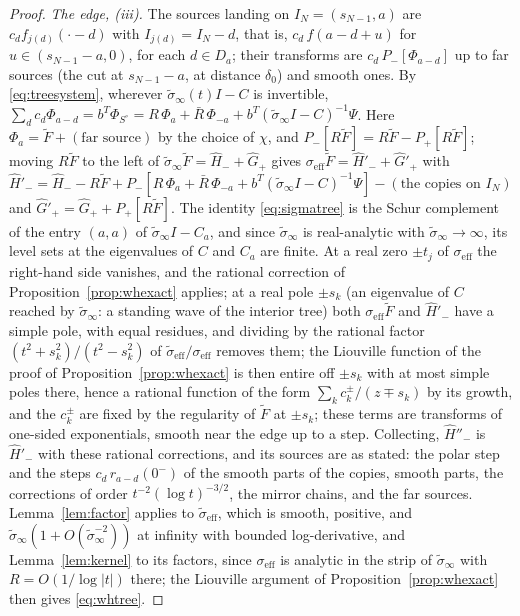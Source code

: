 \documentclass[11pt]{article}
\theoremstyle{definition}
\theoremstyle{remark}
\begin{document}
\begin{proof}
\emph{The edge, (iii).} The sources landing on $I_N=(s_{N-1},a)$ are $c_d f_{j(d)}(\cdot-d)$ with $I_{j(d)}=I_N-d$, that is, $c_d\,f(a-d+u)$ for $u\in(s_{N-1}-a,0)$, for each $d\in D_a$; their transforms are $c_d\,P_-[\Phi_{a-d}]$ up to far sources (the cut at $s_{N-1}-a$, at distance $\delta_0$) and smooth ones. By \eqref{eq:treesystem}, wherever $\tilde\sigma_\infty(t)I-C$ is invertible, $\sum_dc_d\Phi_{a-d}=b^{T}\Phi_{S^\circ}=R\,\Phi_a+\bar R\,\Phi_{-a}+b^T(\tilde\sigma_\infty I-C)^{-1}\Psi$. Here $\Phi_a=\tilde F+(\text{far source})$ by the choice of $\chi$, and $P_-[R\tilde F]=R\tilde F-P_+[R\tilde F]$; moving $R\tilde F$ to the left of $\tilde\sigma_\infty\tilde F=\hat H_-+\hat G_+$ gives $\sigma_{\mathrm{eff}}\tilde F=\hat H'_-+\hat G'_+$ with $\hat H'_-=\hat H_--R\tilde F+P_-[R\,\Phi_a+\bar R\,\Phi_{-a}+b^T(\tilde\sigma_\infty I-C)^{-1}\Psi]-(\text{the copies on }I_N)$ and $\hat G'_+=\hat G_++P_+[R\tilde F]$. The identity \eqref{eq:sigmatree} is the Schur complement of the entry $(a,a)$ of $\tilde\sigma_\infty I-C_a$, and since $\tilde\sigma_\infty$ is real-analytic with $\tilde\sigma_\infty\to\infty$, its level sets at the eigenvalues of $C$ and $C_a$ are finite. At a real zero $\pm t_j$ of $\sigma_{\mathrm{eff}}$ the right-hand side vanishes, and the rational correction of Proposition~\ref{prop:whexact} applies; at a real pole $\pm s_k$ (an eigenvalue of $C$ reached by $\tilde\sigma_\infty$: a standing wave of the interior tree) both $\sigma_{\mathrm{eff}}\tilde F$ and $\hat H'_-$ have a simple pole, with equal residues, and dividing by the rational factor $(t^2+s_k^2)/(t^2-s_k^2)$ of $\tilde\sigma_{\mathrm{eff}}/\sigma_{\mathrm{eff}}$ removes them; the Liouville function of the proof of Proposition~\ref{prop:whexact} is then entire off $\pm s_k$ with at most simple poles there, hence a rational function of the form $\sum_kc_k^\pm/(z\mp s_k)$ by its growth, and the $c_k^\pm$ are fixed by the regularity of $\tilde F$ at $\pm s_k$; these terms are transforms of one-sided exponentials, smooth near the edge up to a step. Collecting, $\hat H''_-$ is $\hat H'_-$ with these rational corrections, and its sources are as stated: the polar step and the steps $c_d\,r_{a-d}(0^-)$ of the smooth parts of the copies, smooth parts, the corrections of order $t^{-2}(\log t)^{-3/2}$, the mirror chains, and the far sources. Lemma~\ref{lem:factor} applies to $\tilde\sigma_{\mathrm{eff}}$, which is smooth, positive, and $\tilde\sigma_\infty(1+O(\tilde\sigma_\infty^{-2}))$ at infinity with bounded log-derivative, and Lemma~\ref{lem:kernel} to its factors, since $\sigma_{\mathrm{eff}}$ is analytic in the strip of $\tilde\sigma_\infty$ with $R=O(1/\log|t|)$ there; the Liouville argument of Proposition~\ref{prop:whexact} then gives \eqref{eq:whtree}.
\end{proof}
\end{document}
